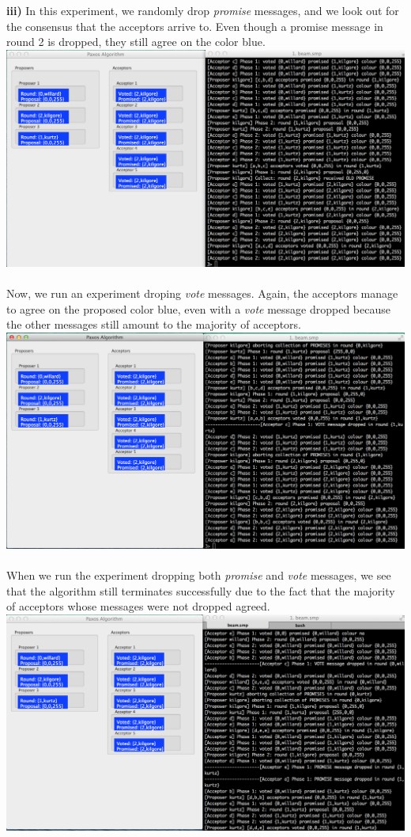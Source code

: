 \documentclass[a4paper, 11pt]{article}
\begin{document}
\textbf{iii)} In this experiment, we randomly drop \textit{promise} messages, and we look out for the consensus that the acceptors arrive to. Even though a promise message in round 2 is dropped, they still agree on the color blue.\\
\includegraphics[scale=0.35]{images/exp5.png} \\\\
\newpage
Now, we run an experiment droping \textit{vote} messages. Again, the acceptors manage to agree on the proposed color blue, even with a \textit{vote} message dropped because the other messages still amount to the majority of acceptors.\\
\includegraphics[scale=0.35]{images/exp6.png} \\\\
When we run the experiment dropping both \textit{promise} and \textit{vote} messages, we see that the algorithm still terminates successfully due to the fact that the majority of acceptors whose messages were not dropped agreed.\\
\includegraphics[scale=0.35]{images/exp7.png} \\\\
\end{document}
